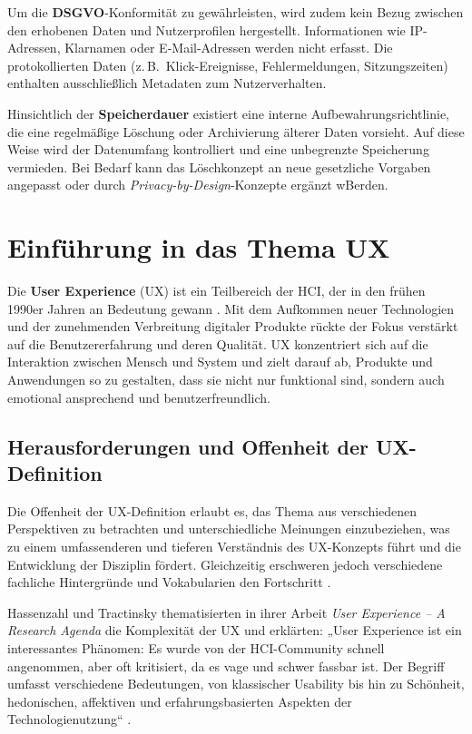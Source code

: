 \documentclass[12pt,oneside]{article}
\begin{document}
Um die \textbf{DSGVO}-Konformität zu gewährleisten, wird zudem kein Bezug zwischen den erhobenen Daten und Nutzerprofilen hergestellt. Informationen wie IP-Adressen, Klarnamen oder E-Mail-Adressen werden nicht erfasst. Die protokollierten Daten (z.\,B.\ Klick-Ereignisse, Fehlermeldungen, Sitzungszeiten) enthalten ausschließlich Metadaten zum Nutzerverhalten. 

Hinsichtlich der \textbf{Speicherdauer} existiert eine interne Aufbewahrungsrichtlinie, die eine regelmäßige Löschung oder Archivierung älterer Daten vorsieht. Auf diese Weise wird der Datenumfang kontrolliert und eine unbegrenzte Speicherung vermieden. Bei Bedarf kann das Löschkonzept an neue gesetzliche Vorgaben angepasst oder durch \emph{Privacy-by-Design}-Konzepte ergänzt wBerden.



\section{Einführung in das Thema UX}

Die \textbf{User Experience} (UX) ist ein Teilbereich der HCI, der in den frühen 1990er Jahren an Bedeutung gewann \cite{glanznig}. Mit dem Aufkommen neuer Technologien und der zunehmenden Verbreitung digitaler Produkte rückte der Fokus verstärkt auf die Benutzererfahrung und deren Qualität. UX konzentriert sich auf die Interaktion zwischen Mensch und System und zielt darauf ab, Produkte und Anwendungen so zu gestalten, dass sie nicht nur funktional sind, sondern auch emotional ansprechend und benutzerfreundlich.

\subsection{Herausforderungen und Offenheit der UX-Definition}

Die Offenheit der UX-Definition erlaubt es, das Thema aus verschiedenen Perspektiven zu betrachten und unterschiedliche Meinungen einzubeziehen, was zu einem umfassenderen und tieferen Verständnis des UX-Konzepts führt und die Entwicklung der Disziplin fördert. Gleichzeitig erschweren jedoch verschiedene fachliche Hintergründe und Vokabularien den Fortschritt \cite{glanznig}.

Hassenzahl und Tractinsky thematisierten in ihrer Arbeit \textit{User Experience – A Research Agenda} die Komplexität der UX und erklärten: „User Experience ist ein interessantes Phänomen: Es wurde von der HCI-Community schnell angenommen, aber oft kritisiert, da es vage und schwer fassbar ist. Der Begriff umfasst verschiedene Bedeutungen, von klassischer Usability bis hin zu Schönheit, hedonischen, affektiven und erfahrungsbasierten Aspekten der Technologienutzung“ \cite{research}.
\end{document}

